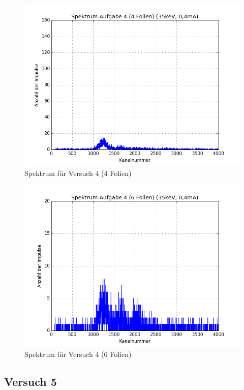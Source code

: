 \begin{figure}[h]
 \centering
 \includegraphics[scale=0.7]{./fig/a4_spec4.png}
 \caption{Spektrum für Versuch 4 (4 Folien)}
 \label{fig:spek44}
\end{figure}

\begin{figure}[h]
 \centering
 \includegraphics[scale=0.7]{./fig/a4_spec6.png}
 \caption{Spektrum für Versuch 4 (6 Folien)}
 \label{fig:spek46}
\end{figure}

\subsection{Versuch 5}

